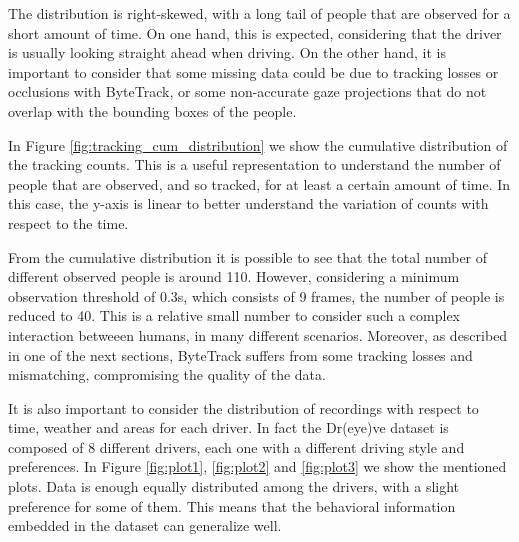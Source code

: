 The distribution is right-skewed, with a long tail of people that are observed 
for a short amount of time. 
On one hand, this is expected, considering that the driver is usually looking 
straight ahead when driving. On the other hand, it is important to consider 
that some missing data could be due to tracking losses or occlusions with 
ByteTrack, or some non-accurate gaze projections that do not overlap with the 
bounding boxes of the people.

In Figure \ref{fig:tracking_cum_distribution} we show the cumulative distribution 
of the tracking counts. This is a useful representation to understand the number 
of people that are observed, and so tracked, for at least a certain amount of time. 
In this case, the y-axis is linear to better understand the variation of counts 
with respect to the time.

From the cumulative distribution it is possible to see that the total number of 
different observed people is around 110. However, considering a minimum observation 
threshold of 0.3s, which consists of 9 frames, the number of people is reduced 
to 40.
This is a relative small number to consider such a complex interaction betweeen 
humans, in many different scenarios. Moreover, as described in one of the next 
sections, ByteTrack suffers from some tracking losses and mismatching, 
compromising the quality of the data.

It is also important to consider the distribution of recordings with respect to 
time, weather and areas for each driver. In fact the Dr(eye)ve dataset is 
composed of 8 different drivers, each one with a different driving style and 
preferences. In Figure \ref{fig:plot1}, \ref{fig:plot2} and \ref{fig:plot3} we 
show the mentioned plots. Data is enough equally distributed among the drivers, 
with a slight preference for some of them. This means that the behavioral 
information embedded in the dataset can generalize well.

